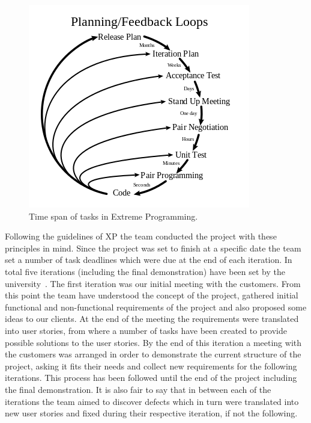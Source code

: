 \documentclass{l3proj}
\begin{document}
\begin{figure}
\includegraphics[width=1.1\linewidth]{figures/Extreme_Programming}
\caption{Time span of tasks in Extreme Programming.}
\label{fig:extreme-programming}
\end{figure}

Following the guidelines of XP the team conducted the project with these principles in mind. Since the project was set to finish at a specific date the team set a number of task deadlines which were due at the end of each iteration. In total five iterations (including the final demonstration) have been set by the university~\cite{Planning}. The first iteration was our initial meeting with the customers. From this point the team have understood the concept of the project, gathered initial functional and non-functional requirements of the project and also proposed some ideas to our clients. At the end of the meeting the requirements were translated into user stories, from where a number of tasks have been created to provide possible solutions to the user stories. By the end of this iteration a meeting with the customers was arranged in order to demonstrate the current structure of the project, asking it fits their needs and collect new requirements for the following iterations. This process has been followed until the end of the project including the final demonstration. It is also fair to say that in between each of the iterations the team aimed to discover defects which in turn were translated into new user stories and fixed during their respective iteration, if not the following.
\end{document}
